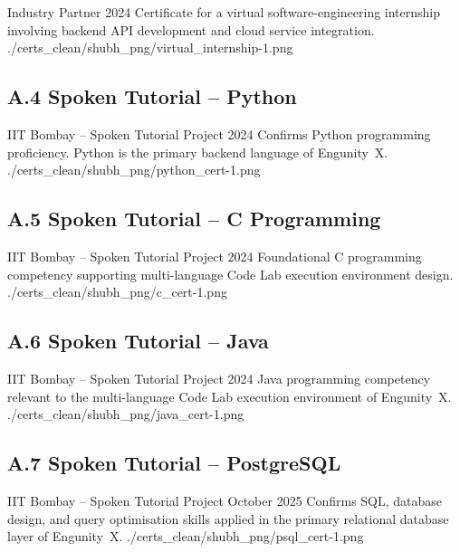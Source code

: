 \certentry
  {Industry Partner}
  {2024}
  {Certificate for a virtual software-engineering internship involving backend
   API development and cloud service integration.}
  {./certs_clean/shubh_png/virtual_internship-1.png}

\subsection*{A.4 \quad Spoken Tutorial -- Python}

\certentry
  {IIT Bombay -- Spoken Tutorial Project}
  {2024}
  {Confirms Python programming proficiency. Python is the primary backend
   language of Engunity~X.}
  {./certs_clean/shubh_png/python_cert-1.png}

\subsection*{A.5 \quad Spoken Tutorial -- C Programming}

\certentry
  {IIT Bombay -- Spoken Tutorial Project}
  {2024}
  {Foundational C programming competency supporting multi-language Code Lab
   execution environment design.}
  {./certs_clean/shubh_png/c_cert-1.png}

\subsection*{A.6 \quad Spoken Tutorial -- Java}

\certentry
  {IIT Bombay -- Spoken Tutorial Project}
  {2024}
  {Java programming competency relevant to the multi-language Code Lab
   execution environment of Engunity~X.}
  {./certs_clean/shubh_png/java_cert-1.png}

\subsection*{A.7 \quad Spoken Tutorial -- PostgreSQL}

\certentry
  {IIT Bombay -- Spoken Tutorial Project}
  {October 2025}
  {Confirms SQL, database design, and query optimisation skills applied in the
   primary relational database layer of Engunity~X.}
  {./certs_clean/shubh_png/psql_cert-1.png}

